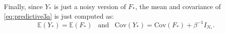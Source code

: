 Finally, since $Y_*$ is just a noisy version of
$F_*$, the mean and covariance of \eqref{eq:predictive3a} is just
computed as: 
\begin{equation}
 \label{eq:predictive4}
\mathbb{E}(Y_*) = \mathbb{E}(F_*) \; \; \; \text{and} \; \; \; \text{Cov}(Y_*) = \text{Cov}(F_*) + \beta^{-1} I_{N_*}.
\end{equation}

%
%




